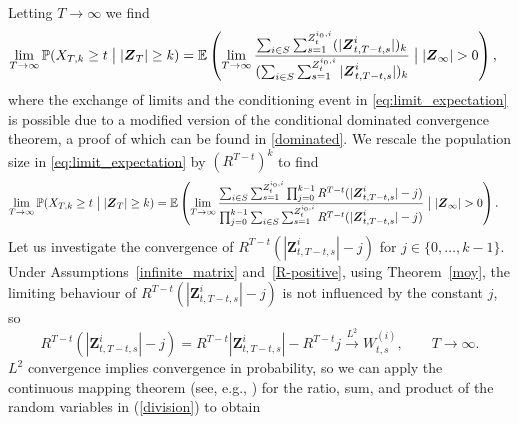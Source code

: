 \documentclass[preprint,3p,12pt]{elsarticle}
\theoremstyle{definition}
\newcommand{\Z}{\boldsymbol{Z}_{t, T-t, s}^{i}}
\newcommand{\z}[1][i_0, i]{Z_t^{#1}}
\begin{document}
Letting $T\to\infty$ we find
\begin{align}
    \lim_{T \rightarrow \infty}\mathbb{P}(X_{T,k} \ge t\bigm| |\boldsymbol{Z}_T| \ge k) %
    &=   \mathbb{E}\left(\lim_{T \rightarrow \infty}\frac{ \sum_{i \in S}\sum_{s=1}^{\z}  (|\Z|)_k}
    {(\sum_{i \in S} \sum_{s=1}^{\z} |\Z|)_k}\bigm| |\boldsymbol{Z}_{\infty}| >0\right),\label{eq:limit_expectation}
\end{align}
where the exchange of limits and the conditioning event in \eqref{eq:limit_expectation} is possible due to a modified version of the conditional dominated convergence theorem, a proof of which can be found in \ref{dominated}. We rescale the population size in  \eqref{eq:limit_expectation} by $(R^{T-t})^k$ to find
\begin{align}
\lim_{T \rightarrow \infty}\mathbb{P}(X_{T,k} \ge t\bigm| |\boldsymbol{Z}_T| \ge k) 
    & = \mathbb{E}\left(\lim_{T \rightarrow \infty}\frac{ \sum_{i \in S}\sum_{s=1}^{\z} \prod_{j=0}^{k-1} R^{T-t}(|\Z|-j)}
    {\prod_{j=0}^{k-1}\sum_{i \in S} \sum_{s=1}^{\z} R^{T-t}(|\Z| - j)}\bigm| |\boldsymbol{Z}_{\infty}| >0\right).\label{division}
\end{align}
Let us investigate the convergence of $ R^{T-t}(|\Z| - j )$ for $j \in \{0,\dots,k-1\}$. Under Assumptions~\ref{infinite_matrix} and~\ref{R-positive}, using Theorem~\ref{moy}, the limiting behaviour of $R^{T-t} (|\Z| - j)$ is not influenced by the constant $j$, so
\begin{equation*}
    R^{T-t} (|\Z| - j) = R^{T-t} |\Z| - R^{T-t} j \xrightarrow{L^2} W^{(i)}_{t, s}, \qquad T\to\infty.
\end{equation*}
$L^2$ convergence implies convergence in probability, so we can apply the continuous mapping theorem (see, e.g., \cite[Chapter 5, p.\ 103]{kallenberg}) for the ratio, sum, and product of the random variables in (\ref{division}) to obtain
\end{document}
